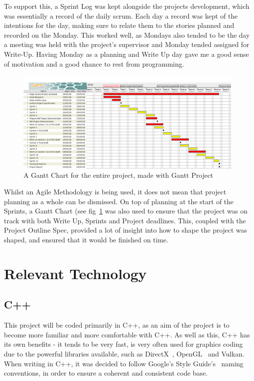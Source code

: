 \documentclass[a4paper,10pt]{report}
\begin{document}
To support this, a Sprint Log was kept alongside the projects development, which was essentially a record of the daily scrum. Each day a record was kept of the intentions for the day, making sure to relate them to the stories planned and recorded on the Monday. This worked well, as Mondays also tended to be the day a meeting was held with the project's supervisor and Monday tended assigned for Write-Up. Having Monday as a planning and Write Up day gave me a good sense of motivation and a good chance to rest from programming. \medskip

\begin{figure}[h!]
    \centering
  \includegraphics[width=1\textwidth]{Images/Charts/GanttChart.png}
 \caption{A Gantt Chart for the entire project, made with Gantt Project~\cite{gantt}}
 \label{fig:gantt_chart}
\end{figure}


Whilst an Agile Methodology is being used, it does not mean that project planning as a whole can be dismissed. On top of planning at the start of the Sprints, a Gantt Chart (see fig~\ref{fig:gantt_chart} was also used to ensure that the project was on track with both Write Up, Sprints and Project deadlines. This, coupled with the Project Outline Spec, provided a lot of insight into how to shape the project was shaped, and ensured that it would be finished on time. \medskip


\section{Relevant Technology}

\subsection{C++}

This project will be coded primarily in C++, as an aim of the project is to become more familiar and more comfortable with C++. As well as this, C++ has its own benefits - it tends to be very fast, is very often used for graphics coding due to the powerful libraries available, such as DirectX~\cite{directx_website}, OpenGL~\cite{OpenGL_website} and Vulkan. When writing in C++, it was decided to follow Google's Style Guide's~\cite{google_c_style_guide} naming conventions, in order to ensure a coherent and consistent code base.
\end{document}
